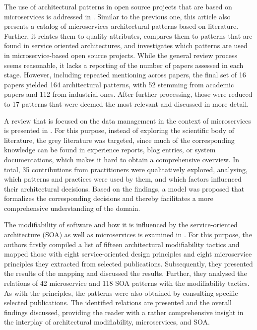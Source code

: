 \documentclass{bmcart}
\begin{document}
The use of architectural patterns in open source projects that are based on microservices is addressed in \cite{Marquez.2018}. Similar to the previous one, this article also presents a catalog of microservices architectural patterns based on literature. Further, it relates them to quality attributes, compares them to patterns that are found in service oriented architectures, and investigates which patterns are used in microservice-based open source projects. While the general review process seems reasonable, it lacks a reporting of the number of papers assessed in each stage. However, including repeated mentioning across papers, the final set of 16 papers yielded 164 architectural patterns, with 52 stemming from academic papers and 112 from industrial ones. After further processing, those were reduced to 17 patterns that were deemed the most relevant and discussed in more detail.

A review that is focused on the data management in the context of microservices is presented in \cite{Ntentos.2019}. For this purpose, instead of exploring the scientific body of literature, the grey literature was targeted, since much of the corresponding knowledge can be found in experience reports, blog entries, or system documentations, which makes it hard to obtain a comprehensive overview. In total, 35 contributions from practitioners were qualitatively explored, analysing, which patterns and practices were used by them, and which factors influenced their architectural decisions. Based on the findings, a model was proposed that formalizes the corresponding decisions and thereby facilitates a more comprehensive understanding of the domain.

The modifiability of software and how it is influenced by the service-oriented architecture (SOA) as well as microservices is examined in \cite{Bogner.2019}. For this purpose, the authors firstly compiled a list of fifteen architectural modifiability tactics and mapped those with eight service-oriented design principles and eight microservice principles they extracted from selected publications. Subsequently, they presented the results of the mapping and discussed the results. Further, they analysed the relations of 42 microservice and 118 SOA patterns with the modifiability tactics. As with the principles, the patterns were also obtained by consulting specific selected publications. The identified relations are presented and the overall findings discussed, providing the reader with a rather comprehensive insight in the interplay of architectural modifiability, microservices, and SOA.
\end{document}
